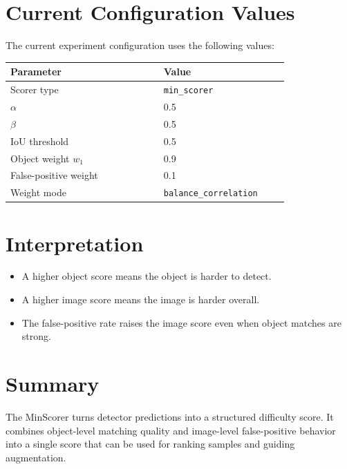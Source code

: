 \documentclass[11pt]{article}
\begin{document}
\section{Current Configuration Values}
The current experiment configuration uses the following values:

\begin{center}
\begin{tabular}{>{\raggedright\arraybackslash}p{0.45\linewidth} p{0.35\linewidth}}
\toprule
Parameter & Value \\
\midrule
Scorer type & \texttt{min\_scorer} \\
\(\alpha\) & 0.5 \\
\(\beta\) & 0.5 \\
IoU threshold & 0.5 \\
Object weight \(w_1\) & 0.9 \\
False-positive weight & 0.1 \\
Weight mode & \texttt{balance\_correlation} \\
\bottomrule
\end{tabular}
\end{center}

\section{Interpretation}
\begin{itemize}
	\item A higher object score means the object is harder to detect.
	\item A higher image score means the image is harder overall.
	\item The false-positive rate raises the image score even when object matches are strong.
\end{itemize}

\section{Summary}
The MinScorer turns detector predictions into a structured difficulty score. It combines object-level matching quality and image-level false-positive behavior into a single score that can be used for ranking samples and guiding augmentation.
\end{document}
